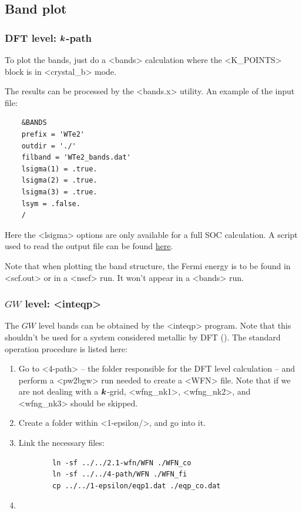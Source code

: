 \documentclass[hyperref, a4paper, 12pt]{report}
\def\texttt#1{<#1>}%
\newcommand{\shortcode}[1]{\texttt{#1}}
\begin{document}
\subsection{Band plot}

\subsubsection{DFT level: $\vb*{k}$-path}\label{sec:calculation.sop.bands.dft-path}

To plot the bands, 
just do a \shortcode{bands} calculation 
where the \shortcode{K_POINTS} block is in \shortcode{crystal_b} mode.

The results can be processed by the \shortcode{bands.x} utility.
An example of the input file:
\begin{lstlisting}
    &BANDS
    prefix = 'WTe2'
    outdir = './'
    filband = 'WTe2_bands.dat' 
    lsigma(1) = .true.
    lsigma(2) = .true.
    lsigma(3) = .true.
    lsym = .false.                                                        
    /
\end{lstlisting}
Here the \shortcode{lsigma} options are only available for a full SOC calculation.
A script used to read the output file 
can be found \href{./scripts/band-on-path/band-plot-example-2.jl}{here}.

Note that when plotting the band structure,
the Fermi energy is to be found in \shortcode{scf.out}
or in a \shortcode{nscf} run.
It won't appear in a \shortcode{bands} run.

\subsubsection{$GW$ level: \shortcode{inteqp}}

The $GW$ level bands can be obtained by the \shortcode{inteqp} program.
Note that this shouldn't be used for a system 
considered metallic by DFT ().
The standard operation procedure is listed here:
\begin{enumerate}
    \item Go to \shortcode{4-path} -- the folder responsible for the DFT level calculation --
    and perform a \shortcode{pw2bgw} run needed to create a \shortcode{WFN} file.
    Note that if we are not dealing with a $\vb*{k}$-grid,
    \shortcode{wfng_nk1}, \shortcode{wfng_nk2}, and \shortcode{wfng_nk3}
    should be skipped.
    \item Create a folder within \shortcode{1-epsilon/},
    and go into it.
    \item Link the necessary files:
    \begin{lstlisting}
        ln -sf ../../2.1-wfn/WFN ./WFN_co
        ln -sf ../../4-path/WFN ./WFN_fi
        cp ../../1-epsilon/eqp1.dat ./eqp_co.dat
    \end{lstlisting}
    \item 
\end{enumerate}
\end{document}
